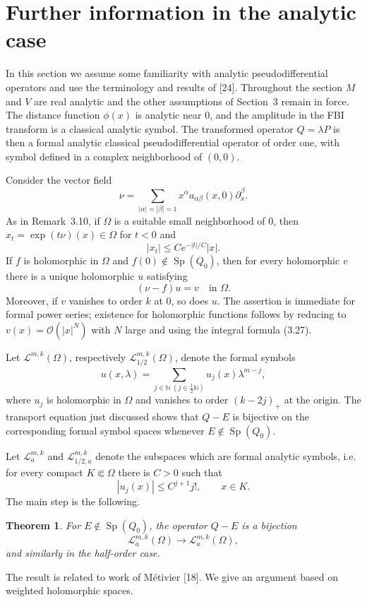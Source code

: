 \documentclass[11pt,a4paper]{article}
\newcommand{\N}{\mathbb N}
\newcommand{\Sp}{\operatorname{Sp}}
\newcommand{\cO}{\mathcal O}
\numberwithin{equation}{section}
\newtheorem{theorem}{Theorem}[section]
\theoremstyle{remark}
\begin{document}
\section{Further information in the analytic case}
In this section we assume some familiarity with analytic pseudodifferential operators and use the terminology and results of [24]. Throughout the section $M$ and $V$ are real analytic and the other assumptions of Section~3 remain in force. The distance function $\phi(x)$ is analytic near $0$, and the amplitude in the FBI transform is a classical analytic symbol. The transformed operator $Q=\lambda P$ is then a formal analytic classical pseudodifferential operator of order one, with symbol defined in a complex neighborhood of $(0,0)$.

Consider the vector field
\[
\nu=\sum_{|\alpha|=|\beta|=1}x^\alpha a_{\alpha\beta}(x,0)\partial_x^\beta.
\]
As in Remark~3.10, if $\Omega$ is a suitable small neighborhood of $0$, then $x_t=\exp(t\nu)(x)\in\Omega$ for $t<0$ and
\[
|x_t|\le Ce^{-|t|/C}|x|.
\]
If $f$ is holomorphic in $\Omega$ and $f(0)\notin\Sp(Q_0)$, then for every holomorphic $v$ there is a unique holomorphic $u$ satisfying
\begin{equation}
(\nu-f)u=v\quad\text{in }\Omega.
\end{equation}
Moreover, if $v$ vanishes to order $k$ at $0$, so does $u$. The assertion is immediate for formal power series; existence for holomorphic functions follows by reducing to $v(x)=\cO(|x|^N)$ with $N$ large and using the integral formula (3.27).

Let $\mathcal L^{m,k}(\Omega)$, respectively $\mathcal L_{1/2}^{m,k}(\Omega)$, denote the formal symbols
\begin{equation}
u(x,\lambda)=\sum_{j\in\N\ (j\in\frac12\N)}u_j(x)\lambda^{m-j},
\end{equation}
where $u_j$ is holomorphic in $\Omega$ and vanishes to order $(k-2j)_+$ at the origin. The transport equation just discussed shows that $Q-E$ is bijective on the corresponding formal symbol spaces whenever $E\notin\Sp(Q_0)$.

Let $\mathcal L_a^{m,k}$ and $\mathcal L_{1/2,a}^{m,k}$ denote the subspaces which are formal analytic symbols, i.e. for every compact $K\Subset\Omega$ there is $C>0$ such that
\[
|u_j(x)|\le C^{j+1}j!,\qquad x\in K.
\]
The main step is the following.

\begin{theorem}
For $E\notin\Sp(Q_0)$, the operator $Q-E$ is a bijection
\[
\mathcal L_a^{m,k}(\Omega)\longrightarrow\mathcal L_a^{m,k}(\Omega),
\]
and similarly in the half-order case.
\end{theorem}
The result is related to work of M\'etivier [18]. We give an argument based on weighted holomorphic spaces.
\end{document}
